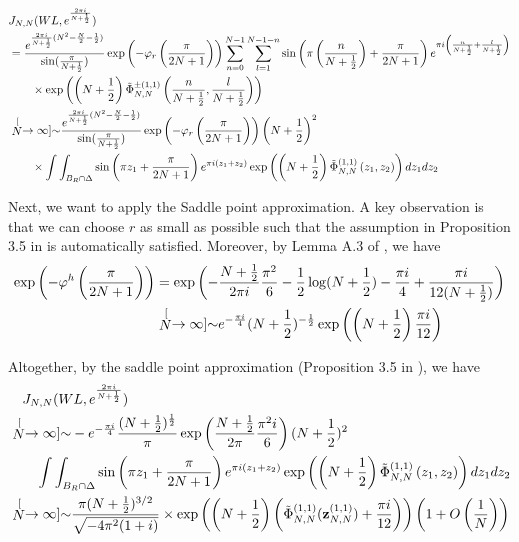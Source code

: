 \documentclass[10pt,a4paper]{article}
\newcommand{\lt}{\left}
\newcommand{\rt}{\right}
\begin{document}
\begin{align}
&J_{N,N} (WL, e^{\frac{2\pi i}{N+\frac{1}{2}}}) \notag\\
&=  \frac{ e^{\frac{2\pi i}{N+\frac{1}{2}}(N^2 - \frac{N}{2} - \frac{1}{2})}}{\sin(\frac{\pi}{N+\frac{1}{2}})} \exp\lt(  -\varphi_r \lt(  \frac{\pi}{2N+1}\rt)\rt)\sum_{n=0}^{N-1}\sum_{l=1}^{N-1-n} \sin\lt( \pi \lt(\frac{n}{N+\frac{1}{2}}\rt) + \frac{\pi}{2N+1} \rt) e^{\pi i \lt(\frac{n}{N+\frac{1}{2}}+\frac{l}{N+\frac{1}{2}}\rt)} \notag\\
&\qquad \times
\exp\lt( \lt(N+\frac{1}{2}\rt) \tilde\Phi^{\pm(1,1)}_{N,N} \lt(\frac{n}{N+\frac{1}{2}},\frac{l}{N+\frac{1}{2}}\rt) \rt) \notag \\
&\stackrel[N \to \infty]{\sim}{} \frac{ e^{\frac{2\pi i}{N+\frac{1}{2}}(N^2 - \frac{N}{2} - \frac{1}{2})}}{\sin(\frac{\pi}{N+\frac{1}{2}})} \exp\lt(  -\varphi_r \lt(  \frac{\pi}{2N+1}\rt)\rt) \lt(N+\frac{1}{2}\rt)^2\notag\\
&\qquad \times \int\int_{B_R \cap \Delta} \sin\lt( \pi z_1 + \frac{\pi}{2N+1} \rt) e^{\pi i \lt(z_1+z_2\rt)} 
\exp\lt( \lt(N+\frac{1}{2}\rt) \tilde\Phi^{(1,1)}_{N,N} \lt(z_1,z_2\rt) \rt) dz_1 dz_2
\end{align}

Next, we want to apply the Saddle point approximation. A key observation is that we can choose $r$ as small as possible such that the assumption in Proposition 3.5 in \cite{O52} is automatically satisfied. Moreover, by Lemma A.3 of \cite{O52}, we have
\begin{align}\label{QDFcoe}
\exp\lt(-\varphi^h \lt( \frac{\pi}{2N+1} \rt) \rt) 
&= \exp\lt(- \frac{N+\frac{1}{2}}{2\pi i} \frac{\pi^2}{6} - \frac{1}{2}\log (N+\frac{1}{2}) - \frac{\pi i}{4} + \frac{\pi i}{12 (N+\frac{1}{2})} \rt) \notag\\
&\stackrel[N \to \infty]{\sim}{ } e^{-\frac{\pi i}{4}}(N+\frac{1}{2})^{-\frac{1}{2}}\exp\lt( \lt( N+\frac{1}{2}\rt) \frac{\pi i}{12} \rt)
\end{align}

Altogether, by the saddle point approximation (Proposition 3.5 in \cite{O52}), we have
\begin{align}
&\quad J_{N, N} (WL, e^{\frac{2\pi i}{N+\frac{1}{2}}}) \notag  \\
&\stackrel[N \to \infty]{\sim}{}  - e^{-\frac{\pi i}{4}} \frac{(N+\frac{1}{2})^{\frac{1}{2}}}{\pi}\exp\lt( \frac{N+\frac{1}{2}}{2\pi } \frac{\pi^2 i}{6} \rt) 
(N+\frac{1}{2})^2 \notag \\
&\qquad \int\int_{B_R \cap \Delta} \sin\lt( \pi z_1 + \frac{\pi}{2N+1} \rt) e^{\pi i \lt(z_1+z_2\rt)} 
\exp\lt( \lt(N+\frac{1}{2}\rt) \tilde\Phi^{(1,1)}_{N,N} \lt(z_1,z_2\rt) \rt) dz_1 dz_2 \notag \\
&\stackrel[N \to \infty]{\sim}{}  \frac{\pi(N+\frac{1}{2})^{3/2}}{\sqrt{ -4 \pi^2(1+i) }} 
\times\exp\lt( \lt(N+\frac{1}{2}\rt)\lt( \tilde\Phi^{(1,1)}_{N,N} (\mathbf{z}^{(1,1)}_{N,N}) + \frac{\pi i}{12} \rt)  \rt) \lt(1 + O\lt(\frac{1}{N}\rt) \rt)
\end{align}
\end{document}
